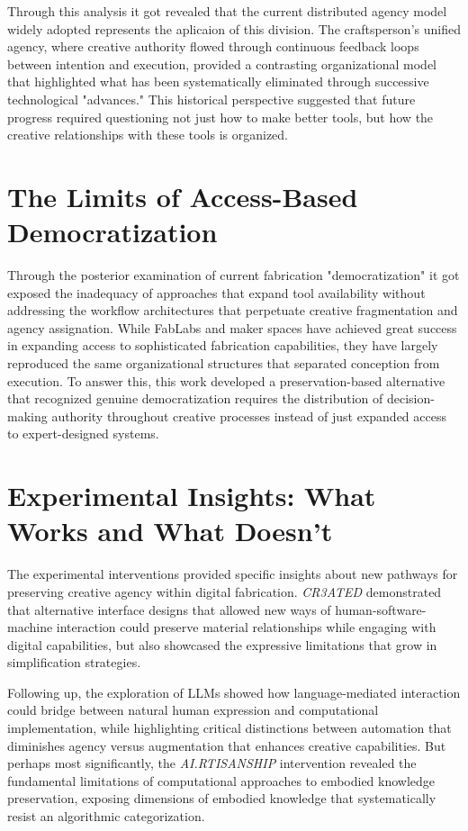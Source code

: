 \vspace{0.5cm}

Through this analysis it got revealed that the current distributed agency model widely adopted represents the aplicaion of this division. The craftsperson's unified agency, where creative authority flowed through continuous feedback loops between intention and execution, provided a contrasting organizational model that highlighted what has been systematically eliminated through successive technological "advances." This historical perspective suggested that future progress required questioning not just how to make better tools, but how the creative relationships with these tools is organized.

\section{The Limits of Access-Based Democratization}

Through the posterior examination of current fabrication "democratization" it got exposed the inadequacy of approaches that expand tool availability without addressing the workflow architectures that perpetuate creative fragmentation and agency assignation. While FabLabs and maker spaces have achieved great success in expanding access to sophisticated fabrication capabilities, they have largely reproduced the same organizational structures that separated conception from execution. To answer this, this work developed a preservation-based alternative that recognized genuine democratization requires the distribution of decision-making authority throughout creative processes instead of just expanded access to expert-designed systems.

\section{Experimental Insights: What Works and What Doesn't}

The experimental interventions provided specific insights about new pathways for preserving creative agency within digital fabrication. \textit{CR3ATED} demonstrated that alternative interface designs that allowed new ways of human-software-machine interaction could preserve material relationships while engaging with digital capabilities, but also showcased the expressive limitations that grow in simplification strategies.

\vspace{0.5cm}

Following up, the exploration of LLMs showed how language-mediated interaction could bridge between natural human expression and computational implementation, while highlighting critical distinctions between automation that diminishes agency versus augmentation that enhances creative capabilities. But perhaps most significantly, the \textit{AI.RTISANSHIP} intervention revealed the fundamental limitations of computational approaches to embodied knowledge preservation, exposing dimensions of embodied knowledge that systematically resist an algorithmic categorization.

